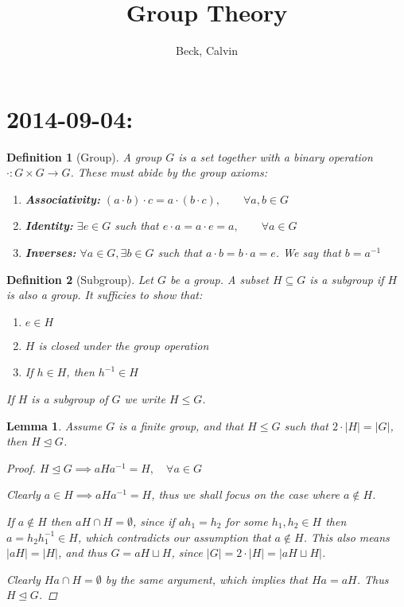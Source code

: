 \documentclass{article}
\author{
  Beck, Calvin\\
}
\title{Group Theory}
\newtheorem{lemma}{Lemma}
\newtheorem{mdef}{Definition}
\newcommand{\normal}{\trianglelefteq}
\begin{document}
\maketitle

\part*{2014-09-04:}

\begin{mdef}[Group]
A group $G$ is a set together with a binary operation $\cdot : G \times G \to G$. These must abide by the group axioms:

\begin{enumerate}
\item \textbf{Associativity:} $(a \cdot b) \cdot c = a \cdot (b \cdot c), \qquad \forall a,b \in G$
\item \textbf{Identity:} $\exists e \in G$ such that $e \cdot a = a \cdot e = a, \qquad \forall a \in G$
\item \textbf{Inverses:} $\forall a \in G, \exists b \in G$ such that $a \cdot b = b \cdot a = e$. We say that $b = a^{-1}$
\end{enumerate}
\end{mdef}

\begin{mdef}[Subgroup]
Let $G$ be a group. A subset $H \subseteq G$ is a subgroup if $H$ is also a group. It sufficies to show that:

\begin{enumerate}
\item $e \in H$
\item $H$ is closed under the group operation
\item If $h \in H$, then $h^{-1} \in H$
\end{enumerate}

If $H$ is a subgroup of $G$ we write $H \leq G$.
\end{mdef}

\begin{lemma}
  Assume $G$ is a finite group, and that $H \leq G$ such that $2 \cdot |H| = |G|$, then $H \normal G$.

  \begin{proof}
    $H \normal G \implies aHa^{-1} = H, \quad \forall a \in G$

    Clearly $a \in H \implies aHa^{-1} = H$, thus we shall focus on the case where $a \not \in H$.

    If $a \not \in H$ then $aH \cap H = \emptyset$, since if $ah_1 = h_2$ for some $h_1, h_2 \in H$ then $a = h_2 h_1^{-1} \in H$, which contradicts our assumption that $a \not \in H$. This also means $|aH| = |H|$, and thus $G = aH \sqcup H$, since $|G| = 2 \cdot |H| = |aH \sqcup H|$.

    Clearly $Ha \cap H = \emptyset$ by the same argument, which implies that $Ha = aH$. Thus $H \normal G$.
  \end{proof}
\end{lemma}
\end{document}
